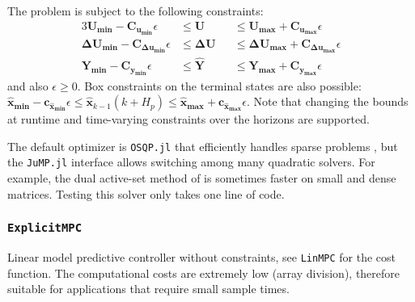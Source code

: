 The problem is subject to the following constraints:
\begin{alignat}{3}
    \mathbf{U_{min}  - C_{u_{min}}}  \epsilon &\le \mathbf{U}  &&\le \mathbf{U_{max}  + C_{u_{max}}}  \epsilon \\
    \mathbf{ΔU_{min} - C_{Δu_{min}}} \epsilon &\le \mathbf{ΔU} &&\le \mathbf{ΔU_{max} + C_{Δu_{max}}} \epsilon \\
    \mathbf{Y_{min}  - C_{y_{min}}}  \epsilon &\le \mathbf{\hat{Y}} &&\le \mathbf{Y_{max}  + C_{y_{max}}}  \epsilon
\end{alignat}
and also $\epsilon \ge 0$.  Box constraints on the terminal states are also possible: $\mathbf{\hat{x}_{min}} {-} \mathbf{c_{\hat{x}_{min}}}\epsilon \le \mathbf{\hat{x}}_{k-1}(k{+}H_p) \le \mathbf{\hat{x}_{max}} + \mathbf{c_{\hat{x}_{max}}}\epsilon$. Note that changing the bounds at runtime and time-varying constraints over the horizons are supported.

The default optimizer is \texttt{OSQP.jl} that efficiently handles sparse problems \citep{osqp}, but the \texttt{JuMP.jl} interface allows switching among many quadratic solvers. For example, the dual active-set method of \citet{daqp} is sometimes faster on small and dense matrices. Testing this solver only takes one line of code.

\subsubsection{\textnormal{\texttt{ExplicitMPC}}}
Linear model predictive controller without constraints, see \texttt{LinMPC} for the cost function. The computational costs are extremely low (array division), therefore suitable for applications that require small sample times.

